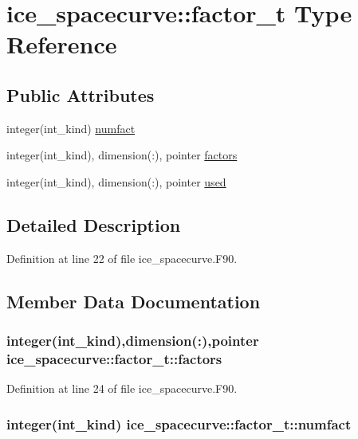 \hypertarget{typeice__spacecurve_1_1factor__t}{
\section{ice\_\-spacecurve::factor\_\-t Type Reference}
\label{typeice__spacecurve_1_1factor__t}
}
\subsection*{Public Attributes}
\begin{DoxyCompactItemize}
\item 
integer(int\_\-kind) \hyperlink{typeice__spacecurve_1_1factor__t_a58dde0d1bbf7a46aea6db62e6f1528df}{numfact}
\item 
integer(int\_\-kind), dimension(:), pointer \hyperlink{typeice__spacecurve_1_1factor__t_a7c63e9f3fe82bc432df410bb1bcb22f6}{factors}
\item 
integer(int\_\-kind), dimension(:), pointer \hyperlink{typeice__spacecurve_1_1factor__t_aa5d5260055cdf1791e45b0f7702ef828}{used}
\end{DoxyCompactItemize}


\subsection{Detailed Description}


Definition at line 22 of file ice\_\-spacecurve.F90.

\subsection{Member Data Documentation}
\hypertarget{typeice__spacecurve_1_1factor__t_a7c63e9f3fe82bc432df410bb1bcb22f6}{
\subsubsection[{factors}]{\setlength{\rightskip}{0pt plus 5cm}integer(int\_\-kind),dimension(:),pointer {\bf ice\_\-spacecurve::factor\_\-t::factors}}}
\label{typeice__spacecurve_1_1factor__t_a7c63e9f3fe82bc432df410bb1bcb22f6}


Definition at line 24 of file ice\_\-spacecurve.F90.\hypertarget{typeice__spacecurve_1_1factor__t_a58dde0d1bbf7a46aea6db62e6f1528df}{
\subsubsection[{numfact}]{\setlength{\rightskip}{0pt plus 5cm}integer(int\_\-kind) {\bf ice\_\-spacecurve::factor\_\-t::numfact}}}
\label{typeice__spacecurve_1_1factor__t_a58dde0d1bbf7a46aea6db62e6f1528df}


